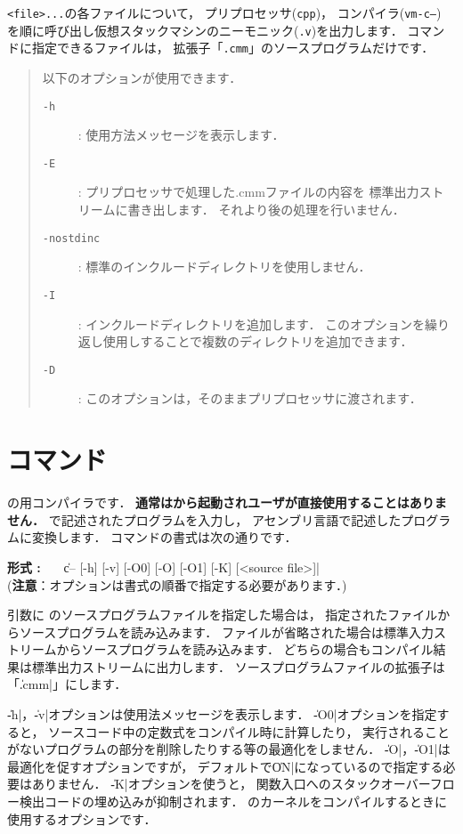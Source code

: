 {\tt <file>...}の各ファイルについて，
プリプロセッサ({\tt cpp})，
コンパイラ({\tt vm-c--})
を順に呼び出し仮想スタックマシンのニーモニック({\tt .v})を出力します．
{\cmv}コマンドに指定できるファイルは，
拡張子「{\tt .cmm}」の{\cmml}ソースプログラムだけです．

\begin{quote}
\hspace{-1em}以下のオプションが使用できます．

\begin{description}
\item[{\tt -h}] : 使用方法メッセージを表示します．
\item[{\tt -E}] : プリプロセッサで処理した{.cmm}ファイルの内容を
標準出力ストリームに書き出します．
それより後の処理を行いません．
\item[{\tt -nostdinc}] : 標準のインクルードディレクトリを使用しません．
\item[{\tt -I}] : インクルードディレクトリを追加します．
このオプションを繰り返し使用しすることで複数のディレクトリを追加できます．
\item[{\tt -D}] : このオプションは，そのままプリプロセッサに渡されます．
\end{description}
\end{quote}

\section{{\cmmc}コマンド}
\label{command:cmmc}

{\cmml}の{\tac}用コンパイラです．
{\bf 通常は{\cme}から起動されユーザが直接使用することはありません．}
\cmml で記述されたプログラムを入力し，
\tac アセンブリ言語で記述したプログラムに変換します．
\cmmc コマンドの書式は次の通りです．

\begin{flushleft}
{\bf 形式 : }~~~\|c-- [-h] [-v] [-O0] [-O] [-O1] [-K] [<source file>]|\\
({\bf 注意}：オプションは書式の順番で指定する必要があります．)
\end{flushleft}

引数に \cmml のソースプログラムファイルを指定した場合は，
指定されたファイルからソースプログラムを読み込みます．
ファイルが省略された場合は標準入力ストリームからソースプログラムを読み込みます．
どちらの場合もコンパイル結果は標準出力ストリームに出力します．
ソースプログラムファイルの拡張子は「\|.cmm|」にします．

\|-h|，\|-v|オプションは使用法メッセージを表示します．
\|-O0|オプションを指定すると，
ソースコード中の定数式をコンパイル時に計算したり，
実行されることがないプログラムの部分を削除したりする等の最適化をしません．
\|-O|，\|-O1|は最適化を促すオプションですが，
デフォルトで\|ON|になっているので指定する必要はありません．
\|-K|オプションを使うと，
関数入口へのスタックオーバーフロー検出コードの埋め込みが抑制されます．
\tacos のカーネルをコンパイルするときに使用するオプションです．

